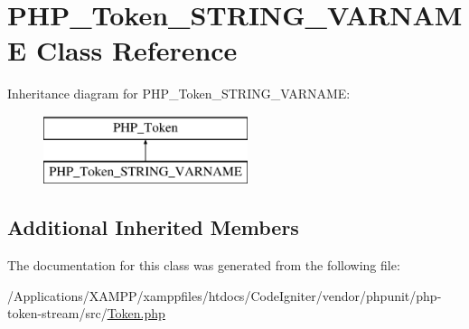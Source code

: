 \hypertarget{class_p_h_p___token___s_t_r_i_n_g___v_a_r_n_a_m_e}{}\section{P\+H\+P\+\_\+\+Token\+\_\+\+S\+T\+R\+I\+N\+G\+\_\+\+V\+A\+R\+N\+A\+ME Class Reference}
\label{class_p_h_p___token___s_t_r_i_n_g___v_a_r_n_a_m_e}
Inheritance diagram for P\+H\+P\+\_\+\+Token\+\_\+\+S\+T\+R\+I\+N\+G\+\_\+\+V\+A\+R\+N\+A\+ME\+:\begin{figure}[H]
\begin{center}
\leavevmode
\includegraphics[height=2.000000cm]{class_p_h_p___token___s_t_r_i_n_g___v_a_r_n_a_m_e}
\end{center}
\end{figure}
\subsection*{Additional Inherited Members}


The documentation for this class was generated from the following file\+:\begin{DoxyCompactItemize}
\item 
/\+Applications/\+X\+A\+M\+P\+P/xamppfiles/htdocs/\+Code\+Igniter/vendor/phpunit/php-\/token-\/stream/src/\mbox{\hyperlink{_token_8php}{Token.\+php}}\end{DoxyCompactItemize}
